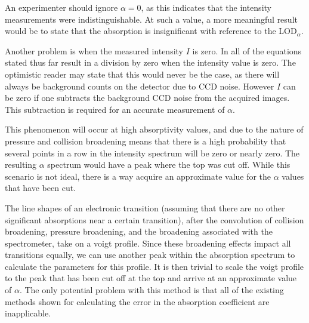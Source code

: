 An experimenter should ignore $\alpha = 0$, as this indicates that the
intensity measurements were indistinguishable. At such a value, a more
meaningful result would be to state that the absorption is insignificant with
reference to the LOD$_{\alpha}$.

Another problem is when the measured intensity $I$ is zero. In all of the
equations stated thus far result in a division by zero when the intensity
value is zero. The optimistic reader may state that this would never be
the case, as there will always be background counts on the detector due to
\ac{CCD} noise. However $I$ can be zero if one subtracts the background
\ac{CCD} noise from the acquired images. This subtraction is required for an
accurate measurement of $\alpha$.

This phenomenon will occur at high absorptivity values, and due to the nature
of pressure and collision broadening means that there is a high probability
that several points in a row in the intensity spectrum will be zero or nearly
zero. The resulting $\alpha$ spectrum would have a peak where the top was cut
off. While this scenario is not ideal, there is a way acquire an approximate
value for the $\alpha$ values that have been cut.

The line shapes of an electronic transition (assuming that there are no other
significant absorptions near a certain transition), after the convolution of
collision broadening, pressure broadening, and the broadening associated with
the spectrometer, take on a voigt profile. Since these broadening effects
impact all transitions equally, we can use another peak within the absorption
spectrum to calculate the parameters for this profile. It is then trivial to
scale the voigt profile to the peak that has been cut off at the top and
arrive at an approximate value of $\alpha$. The only potential problem with
this method is that all of the existing methods shown for calculating the
error in the absorption coefficient are inapplicable.
